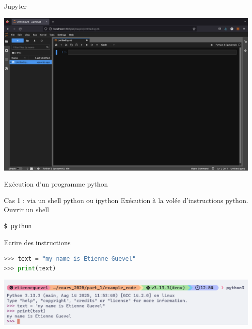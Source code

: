 \begin{frame}{Jupyter}
  \begin{center}
    \includegraphics[width=\textwidth]{img/jupyter-lab-3.png}
  \end{center}
\end{frame}


\begin{frame}[fragile]{Exécution d'un programme python}

  \begin{block}{Cas 1 : via un shell python ou ipython}
      \medskip
      Exécution à la volée d'instructions python. Ouvrir un shell
\begin{lstlisting}[language=bash, morekeywords=\$, numbers=none]
$ python
\end{lstlisting}
      Ecrire des instructions
\begin{lstlisting}[language=python, numbers=none]
>>> text = "my name is Etienne Guevel"
>>> print(text)
\end{lstlisting}
  \end{block}

  \begin{center}
    \includegraphics[width=1.\textwidth]{img/print_shell.png}
  \end{center}

\end{frame}
  

